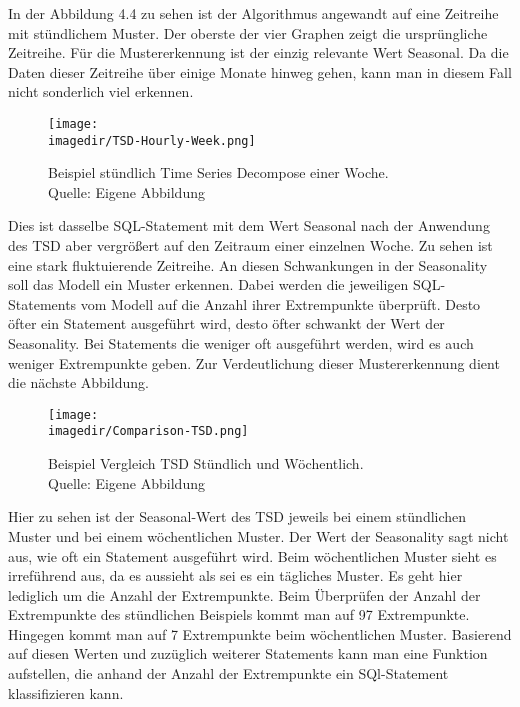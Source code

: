 In der Abbildung 4.4 zu sehen ist der Algorithmus angewandt auf eine Zeitreihe mit stündlichem Muster. Der oberste der vier Graphen zeigt die ursprüngliche Zeitreihe. Für die Mustererkennung ist der einzig relevante Wert Seasonal. Da die Daten dieser Zeitreihe über einige Monate hinweg gehen, kann man in diesem Fall nicht sonderlich viel erkennen.

\begin{figure}[H]

	\centering
	\texttt{[image: \\imagedir/TSD-Hourly-Week.png]}
	\captionsetup{format=hang}
	\caption[Beispiel stündlich Time Series Decompose einer Woche]{\label{fig:test}Beispiel stündlich Time Series Decompose einer Woche. \\Quelle: Eigene Abbildung}

\end{figure}

Dies ist dasselbe SQL-Statement mit dem Wert Seasonal nach der Anwendung des TSD aber vergrößert auf den Zeitraum einer einzelnen Woche. Zu sehen ist eine stark fluktuierende Zeitreihe. An diesen Schwankungen in der Seasonality soll das Modell ein Muster erkennen. Dabei werden die jeweiligen SQL-Statements vom Modell auf die Anzahl ihrer Extrempunkte überprüft. Desto öfter ein Statement ausgeführt wird, desto öfter schwankt der Wert der Seasonality. Bei Statements die weniger oft ausgeführt werden, wird es auch weniger Extrempunkte geben. Zur Verdeutlichung dieser Mustererkennung dient die nächste Abbildung.

\begin{figure}[H]

	\centering
	\texttt{[image: \\imagedir/Comparison-TSD.png]}
	\captionsetup{format=hang}
	\caption[Beispiel Vergleich TSD Stündlich und Wöchentlich]{\label{fig:test}Beispiel Vergleich TSD Stündlich und Wöchentlich. \\Quelle: Eigene Abbildung}

\end{figure}

Hier zu sehen ist der Seasonal-Wert des TSD jeweils bei einem stündlichen Muster und bei einem wöchentlichen Muster. Der Wert der Seasonality sagt nicht aus, wie oft ein Statement ausgeführt wird. Beim wöchentlichen Muster sieht es irreführend aus, da es aussieht als sei es ein tägliches Muster. Es geht hier lediglich um die Anzahl der Extrempunkte. Beim Überprüfen der Anzahl der Extrempunkte des stündlichen Beispiels kommt man auf 97 Extrempunkte. Hingegen kommt man auf 7 Extrempunkte  beim wöchentlichen Muster. Basierend auf diesen Werten und zuzüglich weiterer Statements kann man eine Funktion aufstellen, die anhand der Anzahl der Extrempunkte ein SQl-Statement klassifizieren kann.

